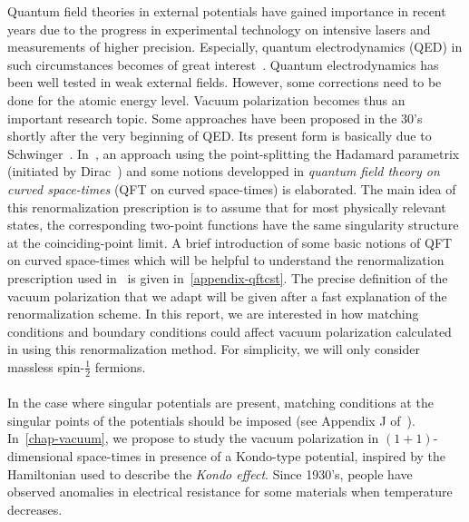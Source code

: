 Quantum field theories in external potentials have gained importance in recent years due to the progress in experimental technology on intensive lasers and measurements of higher precision.
Especially, quantum electrodynamics (QED) in such circumstances becomes of great interest~\cite{Mohr1998}. 
Quantum electrodynamics has been well tested in weak external fields.
However, some corrections need to be done for the atomic energy level. 
Vacuum polarization becomes thus an important research topic. 
Some approaches have been proposed in the 30's shortly after the very beginning of QED.
Its present form is basically due to Schwinger~\cite{Schwinger1951}. 
In~\cite{Zahn2015}, an approach using the point-splitting \wrt the Hadamard parametrix (initiated by Dirac~\cite{Dirac1934}) and some notions developped in \textit{quantum field theory on curved space-times} (QFT on curved space-times) is elaborated. 
The main idea of this renormalization prescription is to assume that for most physically relevant states,
the corresponding two-point functions have the same singularity structure at the coinciding-point limit. 
A brief introduction of some basic notions of QFT on curved space-times which will be helpful to understand the renormalization prescription used in~\cite{Zahn2015} is given in~\cref{appendix-qftcst}.
The precise definition of the vacuum polarization that we adapt will be given after a fast explanation of the renormalization scheme.
In this report, we are interested in how matching conditions and boundary conditions could affect vacuum polarization calculated in using this renormalization method. 
For simplicity,
we will only consider massless spin-$\frac 1 2$ fermions.
\\\\
%
In the case where singular potentials are present, 
matching conditions at the singular points of the potentials should be imposed (see \eg Appendix J of~\cite{albeverio1988solvable}).
In~\cref{chap-vacuum}, we propose to study the vacuum polarization in 
$(1+1)$-dimensional space-times in presence of a Kondo-type potential, inspired by the Hamiltonian used to describe the \textit{Kondo effect}.
Since 1930's, people have observed anomalies in electrical resistance for some materials when temperature decreases. 
